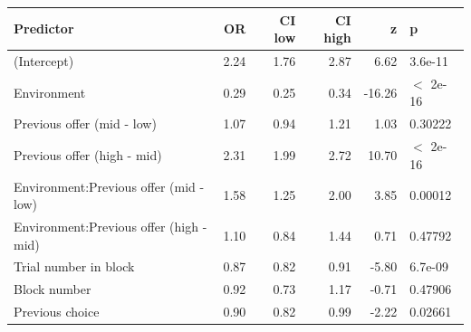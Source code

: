 \begin{table}[ht]
\centering
\begin{tabular}{lrrrrl}
  \hline
Predictor & OR & CI low & CI high & z & p \\ 
  \hline
(Intercept) & 2.24 & 1.76 & 2.87 & 6.62 & 3.6e-11 \\ 
  Environment & 0.29 & 0.25 & 0.34 & -16.26 & $<$ 2e-16 \\ 
  Previous offer (mid - low) & 1.07 & 0.94 & 1.21 & 1.03 & 0.30222 \\ 
  Previous offer (high - mid) & 2.31 & 1.99 & 2.72 & 10.70 & $<$ 2e-16 \\ 
  Environment:Previous offer (mid - low) & 1.58 & 1.25 & 2.00 & 3.85 & 0.00012 \\ 
  Environment:Previous offer (high - mid) & 1.10 & 0.84 & 1.44 & 0.71 & 0.47792 \\ 
  Trial number in block & 0.87 & 0.82 & 0.91 & -5.80 & 6.7e-09 \\ 
  Block number & 0.92 & 0.73 & 1.17 & -0.71 & 0.47906 \\ 
  Previous choice & 0.90 & 0.82 & 0.99 & -2.22 & 0.02661 \\ 
   \hline
\end{tabular}
\end{table}
